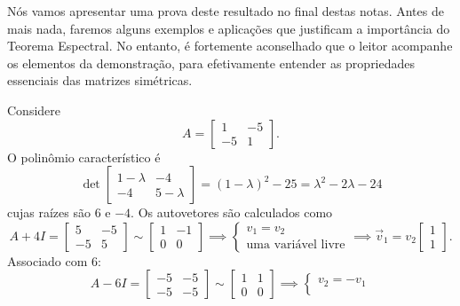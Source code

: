 Nós vamos apresentar uma prova deste resultado no final destas notas. Antes de mais nada, faremos alguns exemplos e aplicações que justificam a importância do Teorema Espectral. No entanto, é fortemente aconselhado que o leitor acompanhe os elementos da demonstração, para efetivamente entender as propriedades essenciais das matrizes simétricas.

\begin{ex}
	Considere
	\begin{equation}
	A = \begin{bmatrix}
	1 & -5 \\
	-5 &  1
	\end{bmatrix}.
	\end{equation} O polinômio característico é
	\begin{equation}
	\det \begin{bmatrix}
	1-\lambda & -4 \\
	-4 & 5-\lambda
	\end{bmatrix} = (1-\lambda)^2 - 25 = \lambda^2 - 2 \lambda - 24
	\end{equation} cujas raízes são $6$ e  $-4$. Os autovetores são calculados como
	\begin{equation}
	A + 4 I =
	\begin{bmatrix}
	5 & -5 \\
	-5 & 5
	\end{bmatrix} \sim
	\begin{bmatrix}
	1 & -1 \\
	0 & 0
	\end{bmatrix} \implies
	\left\{
	\begin{array}{l}
	v_1 = v_2 \\
	\text{uma variável livre}
	\end{array}
	\right. \implies \vec{v}_1 = v_2
	\begin{bmatrix}
	1  \\
	1
	\end{bmatrix}.
	\end{equation} Associado com $6$:
	\begin{equation}
	A - 6 I =
	\begin{bmatrix}
	-5 & -5 \\
	-5 & -5
	\end{bmatrix} \sim
	\begin{bmatrix}
	1 & 1 \\
	0 & 0
	\end{bmatrix} \implies
	\left\{
	\begin{array}{l}
	v_2 = - v_1 \\

\end{array}
\end{equation}
\end{ex}
